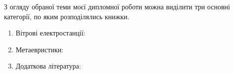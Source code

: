 \documentclass[a4paper]{article}
\begin{document}
    \pagestyle{empty}
    \noindent
    З огляду обраної теми моєї дипломної роботи можна виділити три основні категорії, по яким розподілялись книжки.
    \begin{enumerate}
        \item Вітрові електростанції: \cite{Okedu2023, Nielsen2024, MetaheuristicAlgorithmsinEnergy}
        \item Метаевристики: \cite{Wang2024, Okwu2021}
        \item Додаткова література: \cite{ExamplesEnergyModels, ComputationalIntelligence, Lobato2017, Kaul2021, SS2021, Kumar2020}
    \end{enumerate}

    \nocite{*}
    
    
\end{document}
